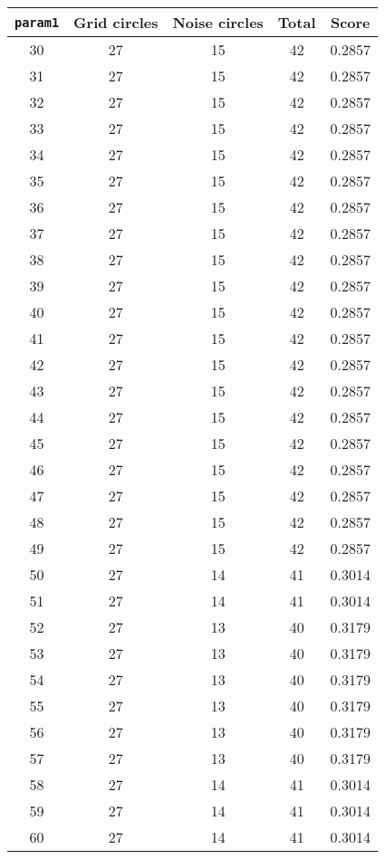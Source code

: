 \documentclass[letterpaper, 12pt]{article}
\begin{document}
\begin{longtable}{|c|c|c|c|c|}
\hline
\textbf{\texttt{param1}} & \textbf{Grid circles} & \textbf{Noise circles} & \textbf{Total} & \textbf{Score} \\
\hline
30 & 27 & 15 & 42 & 0.2857 \\
\hline
31 & 27 & 15 & 42 & 0.2857 \\
\hline
32 & 27 & 15 & 42 & 0.2857 \\
\hline
33 & 27 & 15 & 42 & 0.2857 \\
\hline
34 & 27 & 15 & 42 & 0.2857 \\
\hline
35 & 27 & 15 & 42 & 0.2857 \\
\hline
36 & 27 & 15 & 42 & 0.2857 \\
\hline
37 & 27 & 15 & 42 & 0.2857 \\
\hline
38 & 27 & 15 & 42 & 0.2857 \\
\hline
39 & 27 & 15 & 42 & 0.2857 \\
\hline
40 & 27 & 15 & 42 & 0.2857 \\
\hline
41 & 27 & 15 & 42 & 0.2857 \\
\hline
42 & 27 & 15 & 42 & 0.2857 \\
\hline
43 & 27 & 15 & 42 & 0.2857 \\
\hline
44 & 27 & 15 & 42 & 0.2857 \\
\hline
45 & 27 & 15 & 42 & 0.2857 \\
\hline
46 & 27 & 15 & 42 & 0.2857 \\
\hline
47 & 27 & 15 & 42 & 0.2857 \\
\hline
48 & 27 & 15 & 42 & 0.2857 \\
\hline
49 & 27 & 15 & 42 & 0.2857 \\
\hline
50 & 27 & 14 & 41 & 0.3014 \\
\hline
51 & 27 & 14 & 41 & 0.3014 \\
\hline
52 & 27 & 13 & 40 & 0.3179 \\
\hline
53 & 27 & 13 & 40 & 0.3179 \\
\hline
54 & 27 & 13 & 40 & 0.3179 \\
\hline
55 & 27 & 13 & 40 & 0.3179 \\
\hline
56 & 27 & 13 & 40 & 0.3179 \\
\hline
57 & 27 & 13 & 40 & 0.3179 \\
\hline
58 & 27 & 14 & 41 & 0.3014 \\
\hline
59 & 27 & 14 & 41 & 0.3014 \\
\hline
60 & 27 & 14 & 41 & 0.3014 \\

\end{longtable}
\end{document}
